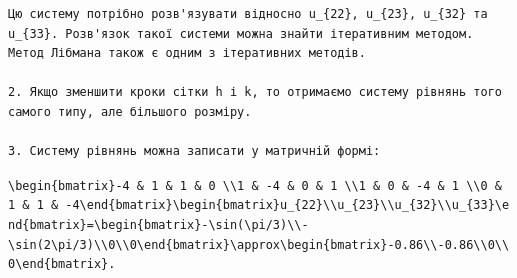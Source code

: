 \documentclass[
  ukrainian,
]{article}
\begin{document}
\begin{verbatim}
Цю систему потрібно розв'язувати відносно u_{22}, u_{23}, u_{32} та u_{33}. Розв'язок такої системи можна знайти ітеративним методом. Метод Лібмана також є одним з ітеративних методів.

2. Якщо зменшити кроки сітки h і k, то отримаємо систему рівнянь того самого типу, але більшого розміру.

3. Систему рівнянь можна записати у матричній формі:
\end{verbatim}

\texttt{\textbackslash{}begin\{bmatrix\}-4\ \&\ 1\ \&\ 1\ \&\ 0\ \textbackslash{}\textbackslash{}1\ \&\ -4\ \&\ 0\ \&\ 1\ \textbackslash{}\textbackslash{}1\ \&\ 0\ \&\ -4\ \&\ 1\ \textbackslash{}\textbackslash{}0\ \&\ 1\ \&\ 1\ \&\ -4\textbackslash{}end\{bmatrix\}\textbackslash{}begin\{bmatrix\}u\_\{22\}\textbackslash{}\textbackslash{}u\_\{23\}\textbackslash{}\textbackslash{}u\_\{32\}\textbackslash{}\textbackslash{}u\_\{33\}\textbackslash{}end\{bmatrix\}=\textbackslash{}begin\{bmatrix\}-\textbackslash{}sin(\textbackslash{}pi/3)\textbackslash{}\textbackslash{}-\textbackslash{}sin(2\textbackslash{}pi/3)\textbackslash{}\textbackslash{}0\textbackslash{}\textbackslash{}0\textbackslash{}end\{bmatrix\}\textbackslash{}approx\textbackslash{}begin\{bmatrix\}-0.86\textbackslash{}\textbackslash{}-0.86\textbackslash{}\textbackslash{}0\textbackslash{}\textbackslash{}0\textbackslash{}end\{bmatrix\}.}
\end{document}
